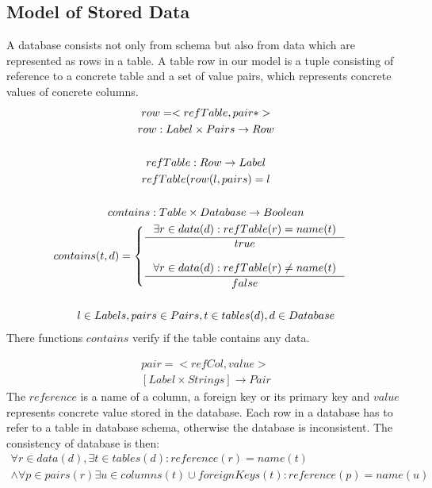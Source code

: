 \documentclass[11pt]{article}
\begin{document}

\subsection{Model of Stored Data}
A database consists not only from schema but also from data which are represented as rows in a table. A table row in our model is a tuple consisting of reference to a concrete table and a set of value pairs, which represents concrete values of concrete columns.
\begin{gather*}
row = < refTable, pair* > \\
row : Label \times Pairs \rightarrow Row \\ \\
refTable : Row \rightarrow Label \\
refTable(row(l, pairs) = l \\ \\
contains : Table \times Database \rightarrow Boolean \\
contains(t, d) = \begin{cases}
 \inference{\exists r \in data(d) : refTable(r) = name(t) }{true} \\ \\
  \inference{\forall r \in data(d) : refTable(r) \neq name(t)}{false}
 \end{cases} \\ \\
 l \in Labels, pairs \in Pairs, t \in tables(d), d \in Database
\end{gather*}
There functions $contains$ verify if the table contains any data.

\begin{gather*}
pair = < refCol, value > \\
[Label \times Strings] \rightarrow Pair
\end{gather*}
The $reference $ is a name of a column, a foreign key or its primary key and $value$ represents concrete value stored in the database. Each row in a database has to refer to a table in database schema, otherwise the database is inconsistent. The consistency of database is then:
\begin{equation*}
\begin{gathered}
\forall r \in data(d), \exists t \in tables(d) : reference(r) = name(t) \\ \wedge \forall p \in pairs(r) \exists u \in columns(t) \cup foreignKeys(t) : reference(p) = name(u) 
\end{gathered}
\end{equation*}
\end{document}
